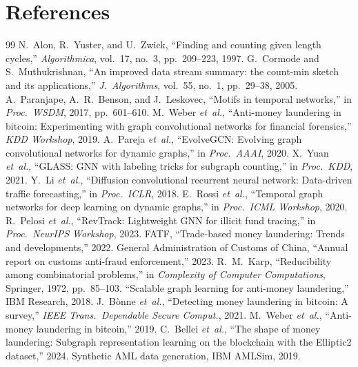\documentclass[journal,onecolumn]{IEEEtran}
\begin{document}
\section*{References}
\label{sec:refs}
\begin{thebibliography}{99}
 N.~Alon, R.~Yuster, and U.~Zwick, ``Finding and counting given length cycles,'' \emph{Algorithmica}, vol.~17, no.~3, pp.~209--223, 1997.
 G.~Cormode and S.~Muthukrishnan, ``An improved data stream summary: the count-min sketch and its applications,'' \emph{J.\ Algorithms}, vol.~55, no.~1, pp.~29--38, 2005.
 A.~Paranjape, A.~R.~Benson, and J.~Leskovec, ``Motifs in temporal networks,'' in \emph{Proc.\ WSDM}, 2017, pp.~601--610.
 M.~Weber \emph{et~al.}, ``Anti-money laundering in bitcoin: Experimenting with graph convolutional networks for financial forensics,'' \emph{KDD Workshop}, 2019.
 A.~Pareja \emph{et~al.}, ``EvolveGCN: Evolving graph convolutional networks for dynamic graphs,'' in \emph{Proc.\ AAAI}, 2020.
 X.~Yuan \emph{et~al.}, ``GLASS: GNN with labeling tricks for subgraph counting,'' in \emph{Proc.\ KDD}, 2021.
 Y.~Li \emph{et~al.}, ``Diffusion convolutional recurrent neural network: Data-driven traffic forecasting,'' in \emph{Proc.\ ICLR}, 2018.
 E.~Rossi \emph{et~al.}, ``Temporal graph networks for deep learning on dynamic graphs,'' in \emph{Proc.\ ICML Workshop}, 2020.
 R.~Pelosi \emph{et~al.}, ``RevTrack: Lightweight GNN for illicit fund tracing,'' in \emph{Proc.\ NeurIPS Workshop}, 2023.
 FATF, ``Trade-based money laundering: Trends and developments,'' 2022.
 General Administration of Customs of China, ``Annual report on customs anti-fraud enforcement,'' 2023.
 R.~M.~Karp, ``Reducibility among combinatorial problems,'' in \emph{Complexity of Computer Computations}, Springer, 1972, pp.~85--103.
 ``Scalable graph learning for anti-money laundering,'' IBM Research, 2018.
 J.~B\`onne \emph{et~al.}, ``Detecting money laundering in bitcoin: A survey,'' \emph{IEEE Trans.\ Dependable Secure Comput.}, 2021.
 M.~Weber \emph{et~al.}, ``Anti-money laundering in bitcoin,'' 2019.
 C.~Bellei \emph{et~al.}, ``The shape of money laundering: Subgraph representation learning on the blockchain with the Elliptic2 dataset,'' 2024.
 Synthetic AML data generation, IBM AMLSim, 2019.

\end{thebibliography}
\end{document}
